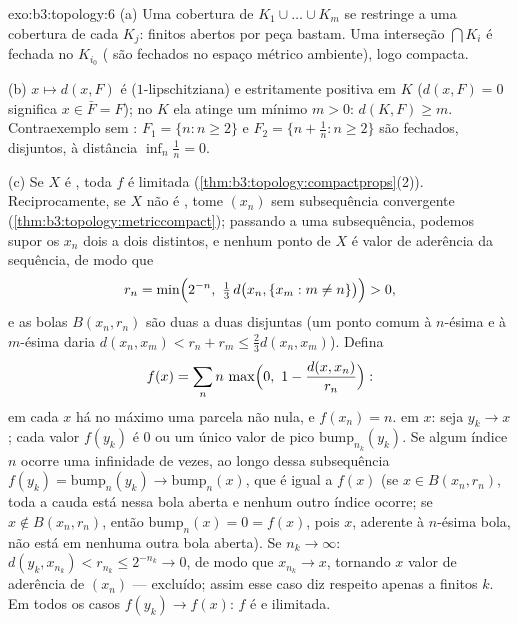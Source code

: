 \begin{solution}{exo:b3:topology:6}
(a) Uma cobertura de $K_1 \cup \dots \cup K_m$ se restringe a uma cobertura de
cada $K_j$: finitos abertos por peça bastam. Uma
interseção $\bigcap K_i$ é fechada no  $K_{i_0}$
( são fechados no espaço métrico ambiente), logo
compacta.

(b) $x \mapsto d(x, F)$ é  ($1$-lipschitziana) e
estritamente positiva em $K$ ($d(x, F) = 0$ significa $x \in \bar F =
F$); no  $K$ ela atinge um mínimo $m > 0$: $d(K, F)
\geq m$. Contraexemplo sem : $F_1 = \{n : n \geq
2\}$ e $F_2 = \{n + \frac1n : n \geq 2\}$ são fechados,
disjuntos, à distância $\inf_n \frac1n = 0$.

(c) Se $X$ é , toda $f$  é limitada
(\cref{thm:b3:topology:compactprops}(2)). Reciprocamente, se $X$ não é
, tome $(x_n)$ sem subsequência convergente
(\cref{thm:b3:topology:metriccompact}); passando a uma
subsequência, podemos supor os $x_n$ dois a dois distintos, e nenhum
ponto de $X$ é valor de aderência da sequência, de modo que
\[
r_n = \min\Bigl(2^{-n},\ \tfrac13\,d\bigl(x_n, \{x_m : m \neq
n\}\bigr)\Bigr) > 0,
\]
e as bolas $B(x_n, r_n)$ são duas a duas disjuntas (um ponto comum
à $n$-ésima e à $m$-ésima daria $d(x_n, x_m) < r_n +
r_m \leq \frac23 d(x_n, x_m)$). Defina
\[
f(x) = \sum_{n} n\,\max\Bigl(0,\ 1 - \frac{d(x,
x_n)}{r_n}\Bigr):
\]
em cada $x$ há no máximo uma parcela não nula, e $f(x_n) = n$.
 em $x$: seja $y_k \to x$; cada valor $f(y_k)$ é
$0$ ou um único valor de pico $\mathrm{bump}_{n_k}(y_k)$.
Se algum índice $n$ ocorre uma infinidade de vezes, ao longo dessa
subsequência $f(y_k) = \mathrm{bump}_n(y_k) \to
\mathrm{bump}_n(x)$, que é igual a $f(x)$ (se $x \in B(x_n,
r_n)$, toda a cauda está nessa bola aberta e nenhum outro
índice ocorre; se $x \notin B(x_n, r_n)$, então
$\mathrm{bump}_n(x) = 0 = f(x)$, pois $x$, aderente à
$n$-ésima bola, não está em nenhuma outra bola aberta). Se $n_k \to \infty$:
$d(y_k, x_{n_k}) < r_{n_k} \leq 2^{-n_k} \to 0$, de modo que $x_{n_k}
\to x$, tornando $x$ valor de aderência de $(x_n)$ --- excluído; assim
esse caso diz respeito apenas a finitos $k$. Em todos os casos
$f(y_k) \to f(x)$: $f$ é  e ilimitada.
\end{solution}

